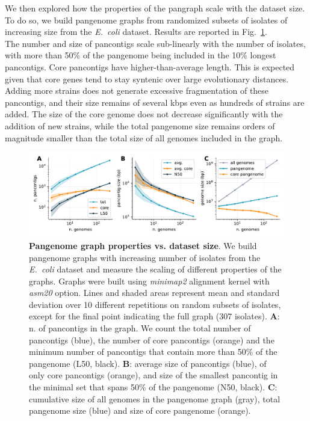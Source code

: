 \documentclass[aps,rmp,preprint,superscriptaddress,10pt,linenumbers]{revtex4-1}
\begin{document}
We then explored how the properties of the pangraph scale with the dataset size. To do so, we build pangenome graphs from randomized subsets of isolates of increasing size from the \textit{E.~coli} dataset. Results are reported in Fig.~\ref{fig:panx-size}.\\
The number and size of pancontigs scale sub-linearly with the number of isolates, with more than 50\% of the pangenome being included in the 10\% longest pancontigs. Core pancontigs have higher-than-average length. This is expected given that core genes tend to stay syntenic over large evolutionary distances. Adding more strains does not generate excessive fragmentation of these pancontigs, and their size remains of several kbps even as hundreds of strains are added. The size of the core genome does not decrease significantly with the addition of new strains, while the total pangenome size remains orders of magnitude smaller than the total size of all genomes included in the graph.


\begin{figure}[htb]
    \includegraphics[width=.9\textwidth]{figs/incr_size.pdf}
    \caption{{\bf Pangenome graph properties vs. dataset size}.
        We build pangenome graphs with increasing number of isolates from the \textit{E.~coli} dataset and measure the scaling of different properties of the graphs. Graphs were built using \textit{minimap2} alignment kernel with \textit{asm20} option. Lines and shaded areas represent mean and standard deviation over 10 different repetitions on random subsets of isolates, except for the final point indicating the full graph (307 isolates).
        \textbf{A}: n. of pancontigs in the graph. We count the total number of pancontigs (blue), the number of core pancontigs (orange) and the minimum number of pancontigs that contain more than 50\% of the pangenome (L50, black).
        \textbf{B}: average size of pancontigs (blue), of only core pancontigs (orange), and size of the smallest pancontig in the minimal set that spans 50\% of the pangenome (N50, black).
        \textbf{C}: cumulative size of all genomes in the pangenome graph (gray), total pangenome size (blue) and size of core pangenome (orange).
    }
    \label{fig:panx-size}
\end{figure}
\end{document}
